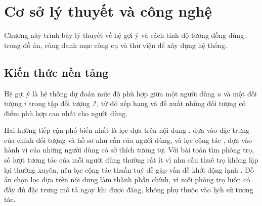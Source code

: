 \chapter{Cơ sở lý thuyết và công nghệ}
\label{ch:coso}

\begin{muctieu}
Chương này trình bày lý thuyết về hệ gợi ý và cách tính độ tương đồng dùng
trong đồ án, cùng danh mục công cụ và thư viện để xây dựng hệ thống.
\end{muctieu}

\section{Kiến thức nền tảng}

\begin{dinhnghia}[Hệ gợi ý]
Hệ gợi ý  là hệ thống dự đoán mức độ phù hợp giữa
một người dùng $u$ và một đối tượng $i$ trong tập đối tượng $\mathcal{I}$,
từ đó xếp hạng và đề xuất những đối tượng có điểm phù hợp cao nhất cho
người dùng.
\end{dinhnghia}

Hai hướng tiếp cận phổ biến nhất là lọc dựa trên nội dung
, dựa vào đặc trưng của chính đối tượng và hồ
sơ nhu cầu của người dùng, và lọc cộng tác ,
dựa vào hành vi của những người dùng có sở thích tương tự. Với bài toán tìm
phòng trọ, số lượt tương tác của mỗi người dùng thường rất ít vì nhu cầu
thuê trọ không lặp lại thường xuyên, nên lọc cộng tác thuần tuý dễ gặp vấn
đề khởi động lạnh . Đồ án chọn lọc dựa trên nội dung làm
thành phần chính, vì mỗi phòng trọ luôn có đầy đủ đặc trưng mô tả ngay khi
được đăng, không phụ thuộc vào lịch sử tương tác.

